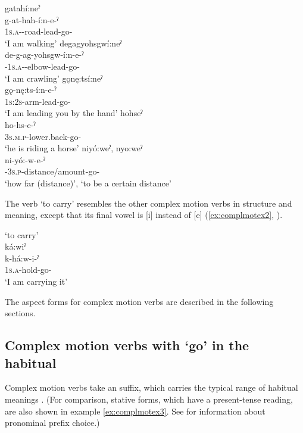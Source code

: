 \ea\label{ex:complmotex20} 
\ea gatahí:neˀ\\
\gll g-at-hah-í:n-e-ˀ\\
 \textsc{1s.a}-{\semireflexive}-road-lead-go-{\stative}\\
\glt `I am walking'
\ex degagyohsgwí:neˀ\\
\gll de-g-ag-yohsgw-í:n-e-ˀ\\
 {\dualic}-\textsc{1s.a}-{\semireflexive}-elbow-lead-go-{\stative}\\
\glt `I am crawling'
\ex gǫnę:tsí:neˀ\\
\gll gǫ-nę:ts-í:n-e-ˀ\\
 \textsc{1s:2s}-arm-lead-go-{\stative}\\
\glt `I am leading you by the hand'
\newpage
\ex hohseˀ\\
\gll ho-hs-e-ˀ\\
 \textsc{3s.m.p}-lower.back-go-{\stative}\\
\glt `he is riding a horse'
\ex niyó:weˀ, nyo:weˀ \\
\gll ni-yó:-w-e-ˀ\\
 {\partitive}-\textsc{3s.p}-distance/amount-go-{\stative}\\
\glt ‘how far (distance)’, `to be a certain distance'
\z
\z

The verb  ‘to carry’ resembles the other complex motion verbs in structure and meaning, except that its final vowel is [i] instead of [e] (\ref{ex:complmotex2}, \cite{sasse_far_1998}).


\ea\label{ex:complmotex2}  ‘to carry’\\
ká:wiˀ\\
\gll k-há:w-i-ˀ\\
 \textsc{1s.a}-hold-go-{\stative}\\
\glt `I am carrying it'
\z


The aspect forms for complex motion verbs are described in the following sections. 


\subsection{Complex motion verbs with  ‘go’ in the habitual} \label{ch:Complex motion verbs in the habitual aspect}
Complex motion verbs take an  \textsc{\habitual} suffix, which carries the typical range of habitual meanings . (For comparison, stative forms, which have a present-tense reading, are also shown in example \ref{ex:complmotex3}. See  for information about pronominal prefix choice.)


